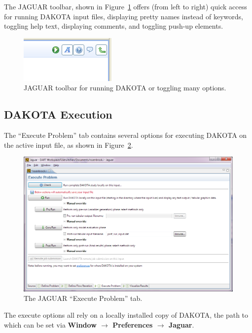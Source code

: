 The JAGUAR toolbar, shown in Figure~\ref{fig:input:jaguar_toolbar}
offers (from left to right) quick access for running DAKOTA input
files, displaying pretty names instead of keywords, toggling help
text, displaying comments, and toggling push-up elements.

\begin{figure}
  \centering
  \includegraphics[scale=0.4]{images/jaguar_toolbar}
  \caption{JAGUAR toolbar for running DAKOTA or toggling many
  options.}
  \label{fig:input:jaguar_toolbar}
\end{figure}


\subsection{DAKOTA Execution}

The ``Execute Problem'' tab contains several options for executing
DAKOTA on the active input file, as shown in
Figure~\ref{fig:input:jag_execute}.
\begin{figure}[htbp]
  \centering
  \includegraphics[scale=0.6]{images/4ExecuteProblem}
  \caption{The JAGUAR ``Execute Problem'' tab.}
  \label{fig:input:jag_execute}
\end{figure}
The execute options all rely on a locally installed copy of DAKOTA,
the path to which can be set via {\bf Window $\rightarrow$ Preferences
  $\rightarrow$ Jaguar}.

